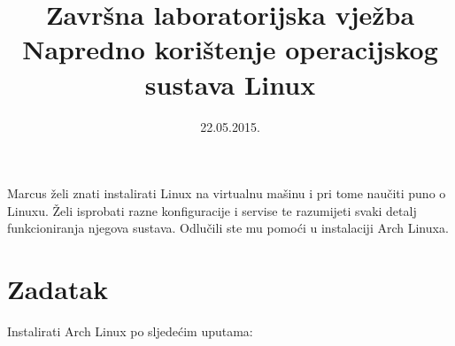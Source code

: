 \documentclass[12pt,a4paper]{article}
\begin{document}
	\title{Završna laboratorijska vježba\\{\large Napredno korištenje operacijskog sustava Linux}}
	\date{\vspace{-5ex} 22.05.2015.}
	\maketitle
	
	Marcus želi znati instalirati Linux na virtualnu mašinu i pri tome naučiti puno o Linuxu. Želi isprobati razne konfiguracije i servise te razumijeti svaki detalj funkcioniranja njegova sustava. Odlučili ste mu pomoći u instalaciji Arch Linuxa.
	
	\section*{Zadatak}
	
	Instalirati Arch Linux po sljedećim uputama:
	
\end{document}
